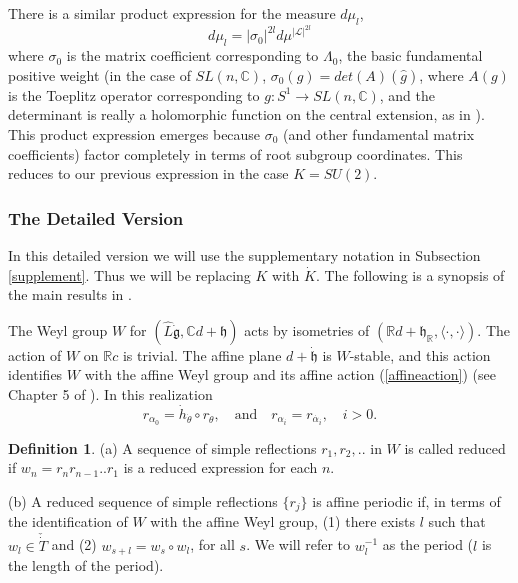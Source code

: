 \documentclass{amsart}
\theoremstyle{conjecture}
\theoremstyle{definition}
\newtheorem{definition}{Definition}
\theoremstyle{question}
\theoremstyle{questions}
\theoremstyle{remark}
\theoremstyle{remarks}
\theoremstyle{example}
\numberwithin{equation}{section}
\begin{document}
There is a similar product expression for the measure $d\mu_l$,
$$d\mu_l=|\sigma_0|^{2l}d\mu^{|\mathcal L|^{2l}}$$
where $\sigma_0$ is the matrix coefficient corresponding to $\Lambda_0$, the basic fundamental positive weight
(in the case of $SL(n,\mathbb C)$, $\sigma_0(g)=det(A)(\widehat{g})$, where $A(g)$ is the Toeplitz operator corresponding to $g:S^1 \to SL(n,\mathbb C)$, and the determinant is really a holomorphic function on the central extension, as in \cite{PS}). This product expression emerges because $\sigma_0$ (and other fundamental matrix coefficients) factor completely in terms of root subgroup coordinates. This reduces to our previous expression in the case $K=SU(2)$.

\subsubsection{The Detailed Version}


In this detailed version we will use the supplementary notation in
Subsection \ref{supplement}. Thus we will be replacing $K$ with $\dot K$.
The following is a synopsis of the main results in \cite{PP}.

The Weyl group $W$ for $(\widehat L\dot{\mathfrak g},\mathbb
Cd+\mathfrak h)$ acts by isometries of $(\mathbb R d+\mathfrak
h_{\mathbb R},\langle \cdot,\cdot \rangle)$. The action of $W$ on
$\mathbb R c$ is trivial. The affine plane $d+\dot{\mathfrak h}$
is $W$-stable, and this action identifies $W$ with the affine Weyl
group and its affine action (\ref{affineaction}) (see Chapter 5 of
\cite{PS}). In this realization
\begin{equation}\label{r0eqn}r_{\alpha_0}= \dot h_{\dot{\theta}}\circ r_{\dot{\theta}}
,\quad \text{and}\quad r_{\alpha_i}=r_{\dot{\alpha_i}},\quad
i>0.\end{equation}


\begin{definition}\label{minimal} (a) A sequence of simple reflections
$r_1,r_2,..$ in $W$ is called reduced if $w_n=r_nr_{n-1}..r_1$ is
a reduced expression for each $n$.

(b) A reduced sequence of simple reflections
$\{r_j\}$ is affine periodic if, in terms of the identification of
$W$ with the affine Weyl group, (1) there exists $l$ such that
$w_l \in \check{\dot T}$ and (2) $w_{s+l}= w_s \circ w_l$, for all
$s$. We will refer to $w_l^{-1}$ as the period ($l$ is the length
of the period).

\end{definition}
\end{document}
